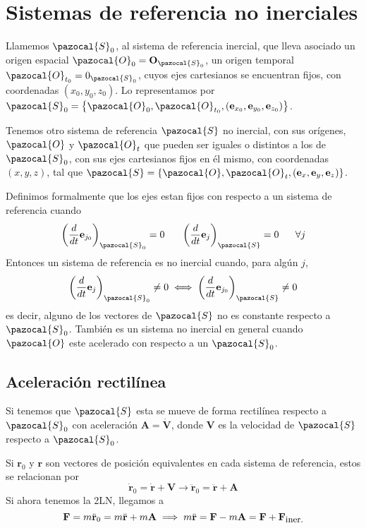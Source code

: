\chapter{Sistemas de referencia no inerciales} 
Llamemos $\pazocal{S}_0$, al sistema de referencia inercial, que lleva asociado un origen espacial $\pazocal{O}_0 = \mathbf{O}_{\pazocal{S}_0}$, un origen temporal $\pazocal{O}_{t_0}=0_{\pazocal{S}_0}$, cuyos ejes cartesianos se encuentran fijos, con coordenadas $(x_0,y_0,z_0)$. Lo representamos por $\pazocal{S}_0 = \left\{\pazocal{O}_0,\pazocal{O}_{t_0},(\mathbf{e}_{x_0},\mathbf{e}_{y_0},\mathbf{e}_{z_0})\right\}$.

Tenemos otro sistema de referencia $\pazocal{S}$ no inercial, con sus orígenes, $\pazocal{O}$ y $\pazocal{O}_{t}$ que pueden ser iguales o distintos a los de $\pazocal{S}_0$, con sus ejes cartesianos fijos en él mismo, con coordenadas $(x,y,z)$, tal que $\pazocal{S} = \left\{\pazocal{O},\pazocal{O}_{t},(\mathbf{e}_x,\mathbf{e}_y,\mathbf{e}_z)\right\}$.

Definimos formalmente que los ejes estan fijos con respecto a un sistema de referencia cuando 
\begin{equation} \label{6.1.1}
    \left(\frac{d}{dt}\mathbf{e}_{j_0}\right)_{\pazocal{S}_0} = 0 \ \ \ \ \ \left(\frac{d}{dt}\mathbf{e}_j\right)_{\pazocal{S}} = 0 \ \ \ \ \ \forall j
\end{equation} 
Entonces un sistema de referencia es no inercial cuando, para algún $j$,
\begin{equation} \label{6.1.1}
    \left(\frac{d}{dt}\mathbf{e}_j\right)_{\pazocal{S}_0} \neq 0 \iff \left(\frac{d}{dt}\mathbf{e}_{j_0}\right)_{\pazocal{S}} \neq 0 
\end{equation} 
es decir, alguno de los vectores de $\pazocal{S}$ no es constante respecto a $\pazocal{S}_0$. También es un sistema no inercial en general cuando $\pazocal{O}$ este acelerado con respecto a un $\pazocal{S}_0$.
\section{Aceleración rectilínea}
Si tenemos que $\pazocal{S}$ esta se mueve de forma rectilínea respecto a $\pazocal{S}_0$ con aceleración $\mathbf{A}=\dot{\mathbf{V}}$, donde $\mathbf{V}$ es la velocidad de $\pazocal{S}$ respecto a $\pazocal{S}_0$.

Si $\mathbf{r}_0$ y $\mathbf{r}$ son vectores de posición equivalentes en cada sistema de referencia, estos se relacionan por
\begin{equation} \label{6.1.1}
    \dot{\mathbf{r}}_0=\dot{\mathbf{r}}+\mathbf{V} \rightarrow \ddot{\mathbf{r}}_0=\ddot{\mathbf{r}}+\mathbf{A}
\end{equation} 
Si ahora tenemos la 2LN, llegamos a 
\begin{equation} \label{6.1.1}
    \mathbf{F} = m\ddot{\mathbf{r}}_0 = m\ddot{\mathbf{r}} + m \mathbf{A} \implies m\ddot{\mathbf{r}} = \mathbf{F}-m \mathbf{A} = \mathbf{F}+\mathbf{F}_{\mbox{\small iner.}}
\end{equation} 